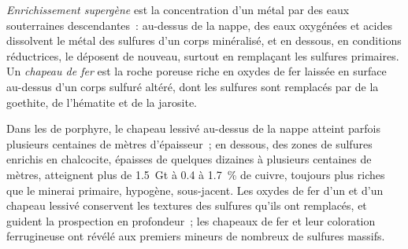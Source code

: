 \begin{definition}\label{def:b2:ore-deposits:supergene}
\emph{Enrichissement supergène} est la concentration d'un métal par
des eaux souterraines descendantes~: au-dessus de la nappe, des eaux oxygénées et acides dissolvent
le métal des sulfures d'un corps minéralisé, et en dessous, en conditions réductrices, le déposent
de nouveau, surtout en remplaçant les sulfures primaires. Un \emph{chapeau de fer}
est la roche poreuse riche en oxydes de fer laissée en surface au-dessus d'un corps sulfuré
altéré, dont les sulfures sont remplacés par de la goethite, de l'hématite et de la jarosite.
\end{definition}

Dans les  de porphyre, le chapeau lessivé au-dessus de la nappe atteint parfois plusieurs centaines de mètres
d'épaisseur~; en dessous, des zones de sulfures enrichis en chalcocite, épaisses de quelques dizaines à plusieurs
centaines de mètres, atteignent plus de \qty{1.5}{Gt} à 0.4 à \qty{1.7}{\percent} de cuivre, toujours plus riches
que le minerai primaire, hypogène, sous-jacent. Les oxydes de fer d'un  et d'un chapeau lessivé
conservent les textures des sulfures qu'ils ont remplacés, et guident la prospection en profondeur~; les chapeaux
de fer et leur coloration ferrugineuse ont révélé aux premiers mineurs de nombreux  de sulfures massifs.

